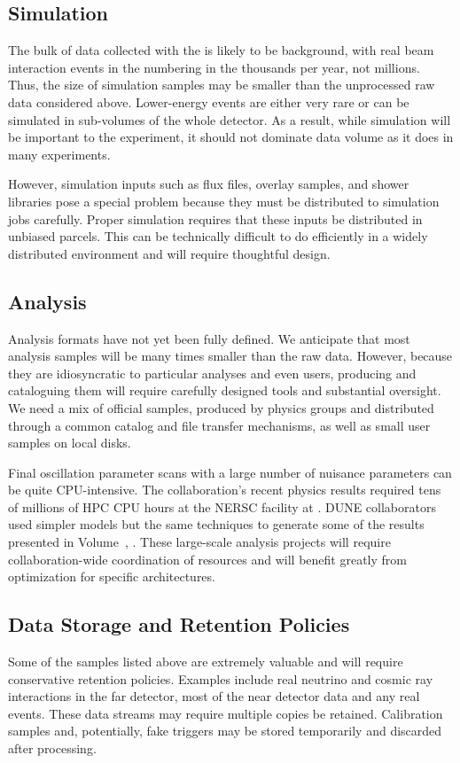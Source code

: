 \subsection{Simulation}
The bulk of data collected with the  is likely to be background, with real beam interaction events in the  numbering in the thousands per year, not millions. Thus, the size of simulation samples may be %
smaller than the unprocessed raw data considered above.  Lower-energy events are either very rare or can be simulated in sub-volumes of the whole detector.  As a result, while simulation will be important to the experiment, it should not dominate data volume as it does in many experiments.  

However, simulation inputs such as flux files, overlay samples, and shower libraries pose a special problem because they must be distributed to simulation jobs carefully.   Proper simulation requires that these inputs be distributed in unbiased parcels.  This can be technically difficult to do efficiently in a widely distributed environment and will require thoughtful design. 

\subsection{Analysis}

Analysis formats have not yet been fully defined.  We anticipate that most analysis samples will be many times smaller than the raw data.  However, because they are idiosyncratic to particular analyses and even users,  producing and cataloguing them will require carefully designed tools and substantial oversight. 
We need a mix of official samples, produced by physics groups and distributed through a common catalog and file transfer mechanisms, as well as small user samples on local disks. 

Final oscillation parameter scans with a large number of nuisance parameters can be quite CPU-intensive.  The  collaboration's recent physics results required tens of millions of  HPC CPU hours at the NERSC facility at . DUNE collaborators used simpler models but the same techniques to generate some of the results presented in Volume~\volnumberphysics{}, \voltitlephysics{}. These large-scale analysis projects will require collaboration-wide coordination of resources and will benefit greatly from optimization for specific architectures.

\subsection{Data Storage and Retention Policies}
Some of the samples listed above are extremely valuable and will require conservative retention policies.   Examples include real neutrino and cosmic ray interactions in the far detector, most of the near detector data and any real  events.  These data streams may require multiple copies be retained. Calibration samples and, potentially, fake  triggers may be stored temporarily and discarded after processing. 



